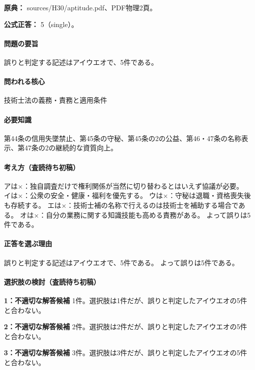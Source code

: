 \noindent\textbf{原典：} sources/H30/aptitude.pdf、PDF物理2頁。

\textbf{公式正答：} 5（single）。

\paragraph{問題の要旨} 誤りと判定する記述はアイウエオで、5件である。

\paragraph{問われる核心} 技術士法の義務・責務と適用条件

\paragraph{必要知識} 第44条の信用失墜禁止、第45条の守秘、第45条の2の公益、第46・47条の名称表示、第47条の2の継続的な資質向上。

\paragraph{考え方（査読待ち初稿）} アは×：独自調査だけで権利関係が当然に切り替わるとはいえず協議が必要。 イは×：公衆の安全・健康・福利を優先する。 ウは×：守秘は退職・資格喪失後も存続する。 エは×：技術士補の名称で行えるのは技術士を補助する場合である。 オは×：自分の業務に関する知識技能も高める責務がある。 よって誤りは5件である。

\paragraph{正答を選ぶ理由} 誤りと判定する記述はアイウエオで、5件である。  よって誤りは5件である。

\paragraph{選択肢の検討（査読待ち初稿）}

\noindent\textbf{1：不適切な解答候補} 1件。選択肢は1件だが、誤りと判定したアイウエオの5件と合わない。\par

\noindent\textbf{2：不適切な解答候補} 2件。選択肢は2件だが、誤りと判定したアイウエオの5件と合わない。\par

\noindent\textbf{3：不適切な解答候補} 3件。選択肢は3件だが、誤りと判定したアイウエオの5件と合わない。\par

